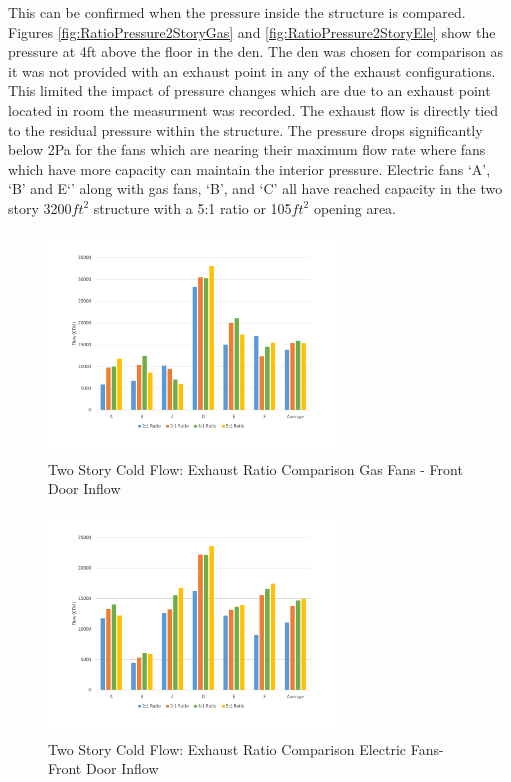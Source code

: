 \documentclass{article}
\begin{document}
This can be confirmed when the pressure inside the structure is compared. Figures \ref{fig:RatioPressure2StoryGas} and \ref{fig:RatioPressure2StoryEle} show the pressure at 4ft above the floor in the den. The den was chosen for comparison as it was not provided with an exhaust point in any of the exhaust configurations. This limited the impact of pressure changes which are due to an exhaust point located in room the measurment was recorded. The exhaust flow is directly tied to the residual pressure within the structure. The pressure drops significantly below 2Pa for the fans which are nearing their maximum flow rate where fans which have more capacity can maintain the interior pressure. Electric fans `A', `B' and E`' along with gas fans, `B', and `C' all have reached capacity in the two story 3200$ft^2$ structure with a 5:1 ratio or 105$ft^2$ opening area. 

\begin{figure}[H]
	\centering
	\includegraphics[width=3in]{0_Images/ColdFlow/Two_Story/RatioFlowDoorGas.pdf}
	\caption{Two Story Cold Flow: Exhaust Ratio Comparison Gas Fans - Front Door Inflow}
	\label{fig:RatioInflow2StoryGas}
\end{figure}

\begin{figure}[H]
	\centering
	\includegraphics[width=3in]{0_Images/ColdFlow/Two_Story/RatioFlowDoorEle.pdf}
	\caption{Two Story Cold Flow: Exhaust Ratio Comparison Electric Fans- Front Door Inflow}
	\label{fig:RatioInflow2StoryEle}
\end{figure}
\end{document}
